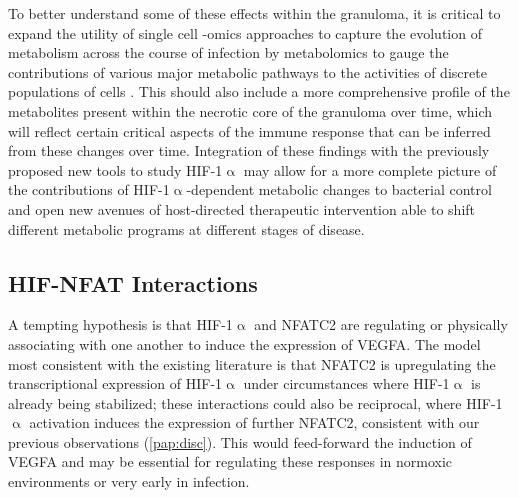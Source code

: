 To better understand some of these effects within the granuloma, it is critical to expand the utility of single cell \hyp{}omics approaches to capture the evolution of metabolism across the course of infection by metabolomics to gauge the contributions of various major metabolic pathways to the activities of discrete populations of cells \citep{Somashekar2011}. This should also include a more comprehensive profile of the metabolites present within the necrotic core of the granuloma over time, which will reflect certain critical aspects of the immune response that can be inferred from these changes over time. Integration of these findings with the previously proposed new tools to study HIF\hyp{}1$\upalpha$ may allow for a more complete picture of the contributions of HIF\hyp{}1$\upalpha$\hyp{}dependent metabolic changes to bacterial control and open new avenues of host\hyp{}directed therapeutic intervention able to shift different metabolic programs at different stages of disease.
 
\subsection{HIF\hyp{}NFAT Interactions}\label{hifnfat}

A tempting hypothesis is that HIF\hyp{}1$\upalpha$ and NFATC2 are regulating or physically associating with one another to induce the expression of VEGFA. The model most consistent with the existing literature is that NFATC2 is upregulating the transcriptional expression of HIF\hyp{}1$\upalpha$ under circumstances where HIF\hyp{}1$\upalpha$ is already being stabilized; these interactions could also be reciprocal, where HIF\hyp{}1$\upalpha$ activation induces the expression of further NFATC2, consistent with our previous observations (\autoref{pap:disc}). This would feed\hyp{}forward the induction of VEGFA and may be essential for regulating these responses in normoxic environments or very early in infection. 

